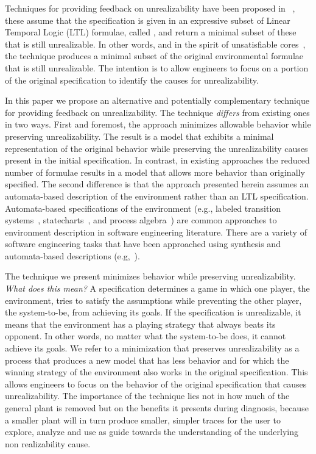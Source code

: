 Techniques for providing feedback on unrealizability have been proposed in ~\cite{DBLP:conf/fmcad/KonighoferHB09, DBLP:journals/scp/Schuppan12,DBLP:conf/fmcad/AlurMT13},
these assume that the specification is given in an expressive subset of Linear Temporal Logic (LTL) formulae, called \gr, and return a minimal subset of these that is still unrealizable. In other words, and in the spirit of unsatisfiable cores~\cite{Torlak:2008}, the technique produces a minimal subset of the original environmental formulae that is still unrealizable. The intention is to allow engineers to focus on a portion of the original specification to identify the causes for unrealizability. 

In this paper we propose an alternative and potentially complementary technique for providing feedback on unrealizability. The technique \textit{differs} from existing ones in two ways. First and foremost, the approach minimizes allowable behavior while preserving unrealizability. The result is a model that exhibits a minimal representation of the original behavior while preserving the unrealizability causes present in the initial specification. In contrast, in existing approaches the reduced number of formulae results in a model that allows more behavior than originally specified. The second difference is that the approach presented herein assumes an automata-based description of the environment rather than an LTL specification. Automata-based specifications of the environment (e.g., labeled transition systems~\cite{Keller:1976}, statecharts~\cite{Harel:1987}, and process algebra~\cite{Milner:1982,Hoare:1983}) are common approaches to environment description in software engineering literature. There are a variety of software engineering tasks that have been approached using synthesis and automata-based descriptions (e.g,~\cite{Letier:2013:RMS,DIppolito:2013,Pistore:2004:PMW}). %

The technique we present minimizes behavior  while preserving unrealizability. \textit{What does this mean?} A specification determines a game in which one player, the environment, tries to satisfy the assumptions while preventing the other player, the system-to-be, from achieving its goals. If the specification is unrealizable, it means that the environment has a playing strategy that always beats its opponent. In other words, no matter what the system-to-be does, it cannot achieve its goals. We refer to a minimization that preserves unrealizability as a process that produces a new model that has less behavior and for which the winning strategy of the environment also works in the original specification. This allows engineers to focus on the behavior of the original specification that causes unrealizability. The importance of the technique lies not in how much of the general plant is removed but on the benefits it presents during diagnosis, because a smaller plant will in turn produce smaller, simpler traces for the user to explore, analyze and use as guide towards the understanding of the underlying non realizability cause.



